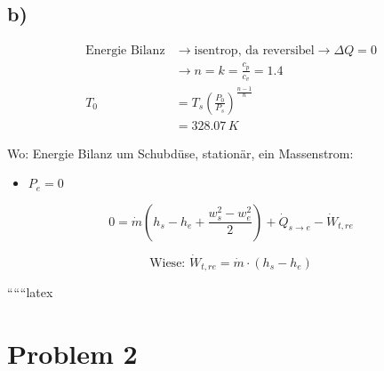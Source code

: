 

\subsection*{b)}

\begin{align*}
    \text{Energie Bilanz} &\rightarrow \text{isentrop, da reversibel} \rightarrow \Delta Q = 0 \\
    &\rightarrow n = k = \frac{c_p}{c_v} = 1.4 \\
    T_0 &= T_s \left( \frac{P_0}{P_s} \right)^{\frac{n-1}{n}} \\
    &= 328.07 \, K
\end{align*}

Wo: Energie Bilanz um Schubdüse, stationär, ein Massenstrom:
\begin{itemize}
    \item $P_e = 0$
\end{itemize}

\[
0 = \dot{m} \left( h_s - h_e + \frac{w_s^2 - w_e^2}{2} \right) + \dot{Q}_{s \rightarrow e} - \dot{W}_{t, re}
\]

\[
\text{Wiese: } \dot{W}_{t, re} = \dot{m} \cdot \left( h_s - h_e \right)
\]

``````latex

\section*{Problem 2}